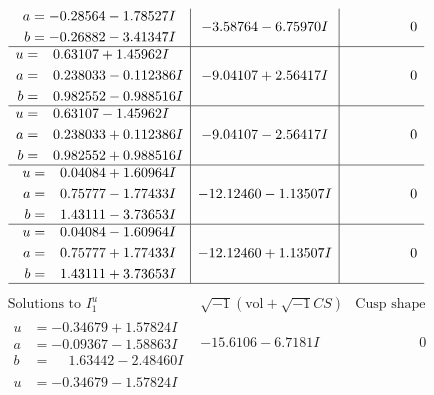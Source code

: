 \documentclass[1p]{elsarticle_modified}
\theoremstyle{definition}
\newcommand{\I}{\sqrt{-1}}
\begin{document}
$$\begin{array}{c|c|c}
\begin{aligned}
a &= -0.28564 - 1.78527 I \\
b &= -0.26882 - 3.41347 I\end{aligned}
 & -3.58764 - 6.75970 I & \phantom{-0.000000 } 0 \\ \hline\begin{aligned}
u &= \phantom{-}0.63107 + 1.45962 I \\
a &= \phantom{-}0.238033 - 0.112386 I \\
b &= \phantom{-}0.982552 - 0.988516 I\end{aligned}
 & -9.04107 + 2.56417 I & \phantom{-0.000000 } 0 \\ \hline\begin{aligned}
u &= \phantom{-}0.63107 - 1.45962 I \\
a &= \phantom{-}0.238033 + 0.112386 I \\
b &= \phantom{-}0.982552 + 0.988516 I\end{aligned}
 & -9.04107 - 2.56417 I & \phantom{-0.000000 } 0 \\ \hline\begin{aligned}
u &= \phantom{-}0.04084 + 1.60964 I \\
a &= \phantom{-}0.75777 - 1.77433 I \\
b &= \phantom{-}1.43111 - 3.73653 I\end{aligned}
 & -12.12460 - 1.13507 I & \phantom{-0.000000 } 0 \\ \hline\begin{aligned}
u &= \phantom{-}0.04084 - 1.60964 I \\
a &= \phantom{-}0.75777 + 1.77433 I \\
b &= \phantom{-}1.43111 + 3.73653 I\end{aligned}
 & -12.12460 + 1.13507 I & \phantom{-0.000000 } 0\\
 \hline 
 \end{array}$$\newpage$$\begin{array}{c|c|c}  
\text{Solutions to }I^u_{1}& \I (\text{vol} + \sqrt{-1}CS) & \text{Cusp shape}\\
 \hline 
\begin{aligned}
u &= -0.34679 + 1.57824 I \\
a &= -0.09367 - 1.58863 I \\
b &= \phantom{-}1.63442 - 2.48460 I\end{aligned}
 & -15.6106 - 6.7181 I & \phantom{-0.000000 } 0 \\ \hline\begin{aligned}
u &= -0.34679 - 1.57824 I \\

\end{aligned}
\end{array}$$
\end{document}
